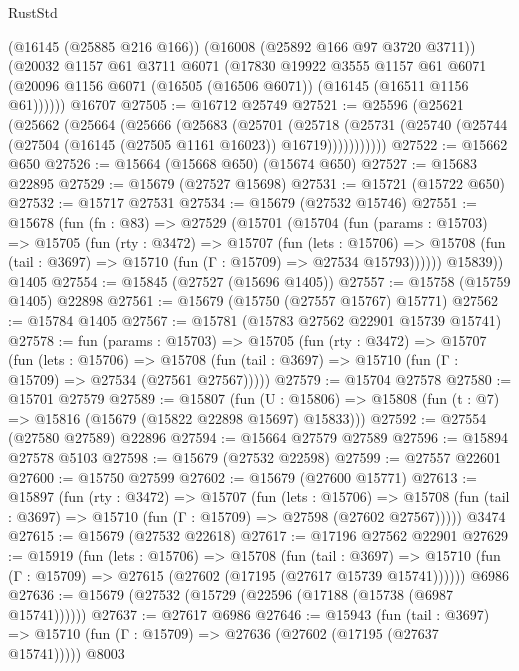 \begin{lexlean}{RustStd}
\begin{coremodule}
      (@16145 (@25885 @216 @166))
      (@16008 (@25892 @166 @97 @3720 @3711))
      (@20032
        @1157
        @61
        @3711
        @6071
        (@17830
          @19922
          @3555
          @1157
          @61
          @6071
          (@20096 @1156 @6071 (@16505 (@16506 @6071)) (@16145 (@16511 @1156 @61))))))
    @16707
@27505 := @16712 @25749
@27521 := @25596
    (@25621
      (@25662
        (@25664
          (@25666
            (@25683
              (@25701
                (@25718
                  (@25731 (@25740 (@25744 (@27504 (@16145 (@27505 @1161 @16023)) @16719)))))))))))
@27522 := @15662 @650
@27526 := @15664 (@15668 @650) (@15674 @650)
@27527 := @15683 @22895
@27529 := @15679 (@27527 @15698)
@27531 := @15721 (@15722 @650)
@27532 := @15717 @27531
@27534 := @15679 (@27532 @15746)
@27551 := @15678
    (fun (fn : @83) =>
    @27529
      (@15701
        (@15704
          (fun (params : @15703) =>
          @15705
            (fun (rty : @3472) =>
            @15707
              (fun (lets : @15706) =>
              @15708 (fun (tail : @3697) => @15710 (fun (Γ : @15709) => @27534 @15793))))))
        @15839))
    @1405
@27554 := @15845 (@27527 (@15696 @1405))
@27557 := @15758 (@15759 @1405) @22898
@27561 := @15679 (@15750 (@27557 @15767) @15771)
@27562 := @15784 @1405
@27567 := @15781 (@15783 @27562 @22901 @15739 @15741)
@27578 := fun (params : @15703) =>
  @15705
    (fun (rty : @3472) =>
    @15707
      (fun (lets : @15706) =>
      @15708 (fun (tail : @3697) => @15710 (fun (Γ : @15709) => @27534 (@27561 @27567)))))
@27579 := @15704 @27578
@27580 := @15701 @27579
@27589 := @15807
    (fun (U : @15806) => @15808 (fun (t : @7) => @15816 (@15679 (@15822 @22898 @15697) @15833)))
@27592 := @27554 (@27580 @27589) @22896
@27594 := @15664 @27579 @27589
@27596 := @15894 @27578 @5103
@27598 := @15679 (@27532 @22598)
@27599 := @27557 @22601
@27600 := @15750 @27599
@27602 := @15679 (@27600 @15771)
@27613 := @15897
    (fun (rty : @3472) =>
    @15707
      (fun (lets : @15706) =>
      @15708 (fun (tail : @3697) => @15710 (fun (Γ : @15709) => @27598 (@27602 @27567)))))
    @3474
@27615 := @15679 (@27532 @22618)
@27617 := @17196 @27562 @22901
@27629 := @15919
    (fun (lets : @15706) =>
    @15708
      (fun (tail : @3697) =>
      @15710 (fun (Γ : @15709) => @27615 (@27602 (@17195 (@27617 @15739 @15741))))))
    @6986
@27636 := @15679 (@27532 (@15729 (@22596 (@17188 (@15738 (@6987 @15741))))))
@27637 := @27617 @6986
@27646 := @15943
    (fun (tail : @3697) => @15710 (fun (Γ : @15709) => @27636 (@27602 (@17195 (@27637 @15741)))))
    @8003

\end{coremodule}
\end{lexlean}
